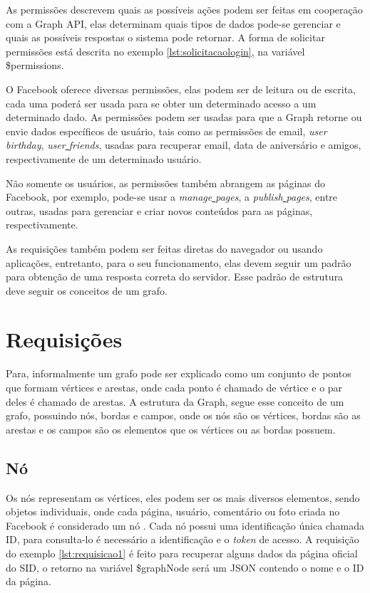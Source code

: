 As permissões descrevem quais as possíveis ações podem ser feitas em cooperação com a Graph API, elas determinam quais tipos de dados pode-se gerenciar e quais as possíveis respostas o sistema pode retornar. A forma de solicitar permissões está descrita no exemplo \ref{lst:solicitacaologin}, na variável \$permissions.

O Facebook oferece diversas permissões, elas podem ser de leitura ou de escrita, cada uma poderá ser usada para se obter um determinado acesso a um determinado dado. As permissões podem ser usadas para que a Graph retorne ou envie dados específicos de usuário, tais como as permissões de email, \textit{user\underline{{ }}birthday}, \textit{user\underline{{ }}friends}, usadas para recuperar email, data de aniversário e amigos, respectivamente de um determinado usuário.

Não somente os usuários, as permissões também abrangem as páginas do Facebook, por exemplo, pode-se usar a \textit{manage\underline{{ }}pages}, a \textit{publish\underline{{ }}pages}, entre outras, usadas para gerenciar e criar novos conteúdos para as páginas, respectivamente.

As requisições também podem ser feitas diretas do navegador ou usando aplicações, entretanto, para o seu funcionamento, elas devem seguir um padrão para obtenção de uma resposta correta do servidor. Esse padrão de estrutura deve seguir os conceitos de um grafo.

\section{Requisições}

Para\cite{soares2014}, informalmente um grafo pode ser explicado como um conjunto de pontos que formam vértices e arestas, onde cada ponto é chamado de vértice e o par deles é chamado de arestas. A estrutura da Graph, segue esse conceito de um grafo, possuindo nós, bordas e campos, onde os nós são os vértices, bordas são as arestas e os campos são os elementos que os vértices ou as bordas possuem.

\subsection{Nó}
Os nós representam os vértices, eles podem ser os mais diversos elementos, sendo objetos individuais, onde cada página, usuário, comentário ou foto criada no Facebook é considerado um nó \cite{facebook2018b}. Cada nó possui uma identificação única chamada ID, para consulta-lo é necessário a identificação e o \textit{token} de acesso. A requisição do exemplo \ref{lst:requisicao1} é feito para recuperar alguns dados da página oficial do SID, o retorno na variável \$graphNode será um JSON contendo o nome e o ID da página.

